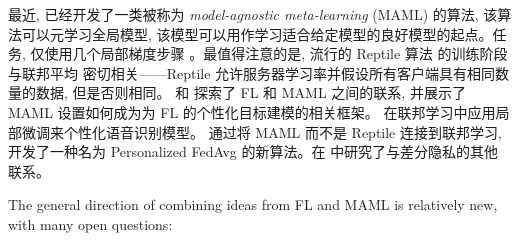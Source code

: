 最近, 已经开发了一类被称为 \emph{model-agnostic meta-learning} (MAML) 的算法, 该算法可以元学习全局模型, 该模型可以用作学习适合给定模型的良好模型的起点。任务, 仅使用几个局部梯度步骤 \citep{finn17maml}。最值得注意的是, 流行的 Reptile 算法 \citep{nichol18reptile} 的训练阶段与联邦平均 \citep{mcmahan17fedavg} 密切相关——Reptile 允许服务器学习率并假设所有客户端具有相同数量的数据, 但是否则相同。 \citet{khodak19adaptive} 和 \citet{jiang2019improving} 探索了 FL 和 MAML 之间的联系, 并展示了 MAML 设置如何成为为 FL 的个性化目标建模的相关框架。 \citet{chai2019personalization} 在联邦学习中应用局部微调来个性化语音识别模型。 \citet{fallah2020personalized} 通过将 MAML 而不是 Reptile 连接到联邦学习, 开发了一种名为 Personalized FedAvg 的新算法。在 \citep{li19dpmeta} 中研究了与差分隐私的其他联系。


The general direction of combining ideas from FL and MAML is relatively new, with many open questions:

